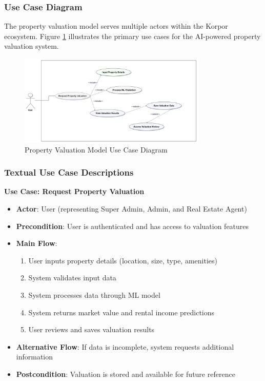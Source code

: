 \subsubsection{Use Case Diagram}
The property valuation model serves multiple actors within the Korpor ecosystem. Figure \ref{fig:valuation-use-case} illustrates the primary use cases for the AI-powered property valuation system.

\begin{figure}[htbp]
    \centering
    \includegraphics[width=0.8\textwidth]{images/valuation_use_case_diagram.png}
    \caption{Property Valuation Model Use Case Diagram}
    \label{fig:valuation-use-case}
\end{figure}

\subsubsection{Textual Use Case Descriptions}

\textbf{Use Case: Request Property Valuation}
\begin{itemize}
    \item \textbf{Actor}: User (representing Super Admin, Admin, and Real Estate Agent)
    \item \textbf{Precondition}: User is authenticated and has access to valuation features
    \item \textbf{Main Flow}: 
    \begin{enumerate}
        \item User inputs property details (location, size, type, amenities)
        \item System validates input data
        \item System processes data through ML model
        \item System returns market value and rental income predictions
        \item User reviews and saves valuation results
    \end{enumerate}
    \item \textbf{Alternative Flow}: If data is incomplete, system requests additional information
    \item \textbf{Postcondition}: Valuation is stored and available for future reference
\end{itemize}

